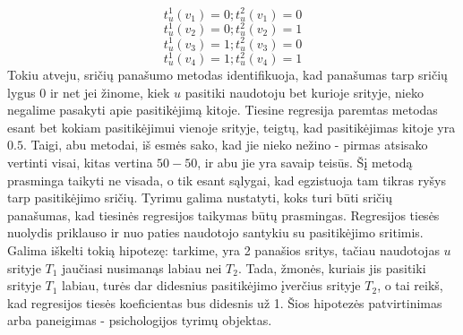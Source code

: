 \documentclass{VUMIFInfMagistrinis}
\begin{document}
\begin{displaymath}
t_{u}^1(v_1)=0; t_{u}^2(v_1)=0
\end{displaymath}
\begin{displaymath}
t_{u}^1(v_2)=0; t_{u}^2(v_2)=1
\end{displaymath}
\begin{displaymath}
t_{u}^1(v_3)=1; t_{u}^2(v_3)=0
\end{displaymath}
\begin{displaymath}
t_{u}^1(v_4)=1; t_{u}^2(v_4)=1
\end{displaymath}
Tokiu atveju, sričių panašumo metodas identifikuoja, kad panašumas tarp sričių lygus 0 ir net jei žinome, kiek $u$ pasitiki naudotoju bet kurioje srityje, nieko negalime pasakyti apie pasitikėjimą kitoje. Tiesine regresija paremtas metodas esant bet kokiam pasitikėjimui vienoje srityje, teigtų, kad pasitikėjimas kitoje yra $0.5$. Taigi, abu metodai, iš esmės sako, kad jie nieko nežino - pirmas atsisako vertinti visai, kitas vertina $50 - 50$, ir abu jie yra savaip teisūs. 
\newline
\indent
 Šį metodą prasminga taikyti ne visada, o tik esant sąlygai, kad egzistuoja tam tikras ryšys tarp pasitikėjimo sričių. Tyrimu galima nustatyti, koks turi būti sričių panašumas, kad tiesinės regresijos taikymas būtų prasmingas. Regresijos tiesės nuolydis priklauso ir nuo paties naudotojo santykiu su pasitikėjimo sritimis. Galima iškelti tokią hipotezę: tarkime, yra 2 panašios sritys, tačiau naudotojas $u$ srityje $T_1$ jaučiasi nusimanąs labiau nei $T_2$. Tada, žmonės, kuriais jis pasitiki srityje $T_1$ labiau, turės dar didesnius pasitikėjimo įverčius srityje $T_2$, o tai reikš, kad regresijos tiesės koeficientas bus didesnis už 1. Šios hipotezės patvirtinimas arba paneigimas - psichologijos tyrimų objektas.
\end{document}
